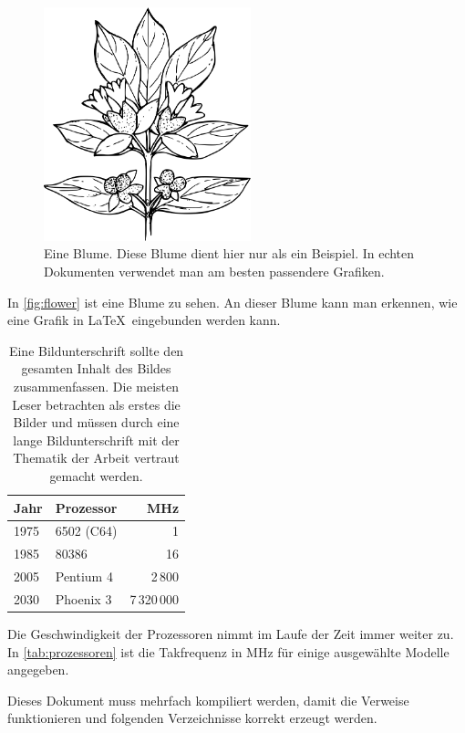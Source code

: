 \documentclass{scrartcl}
\begin{document}
  \begin{figure}
    \centering
    \includegraphics[width=6cm]{flower}
    \caption{Eine Blume. Diese Blume dient hier nur als ein
      Beispiel. In echten Dokumenten verwendet man am besten
      passendere Grafiken.}
    \label{fig:flower}
  \end{figure}

  In \autoref{fig:flower} ist eine Blume zu sehen. An dieser Blume
  kann man erkennen, wie eine Grafik in \LaTeX\ eingebunden werden
  kann.

  \begin{table}
    \centering
    \begin{tabular}{l|lr}
      \textbf{Jahr} & \textbf{Prozessor} &
          \textbf{MHz} \\
      \hline
      1975 & 6502 (C64) & 1 \\
      1985 & 80386 & 16 \\
      2005 & Pentium 4 & 2\,800 \\
      2030 & Phoenix 3 & 7\,320\,000
    \end{tabular}
    \caption{Eine Bildunterschrift sollte den gesamten Inhalt des
      Bildes zusammenfassen. Die meisten Leser betrachten als erstes
      die Bilder und müssen durch eine lange Bildunterschrift mit der
      Thematik der Arbeit vertraut gemacht werden.}
    \label{tab:prozessoren}
  \end{table}

  Die Geschwindigkeit der Prozessoren nimmt im Laufe der Zeit immer
  weiter zu. In \autoref{tab:prozessoren} ist die Takfrequenz in MHz
  für einige ausgewählte Modelle angegeben.

  Dieses Dokument muss mehrfach kompiliert werden, damit die Verweise
  funktionieren und folgenden Verzeichnisse korrekt erzeugt werden.

  \listoffigures
  \listoftables
\end{document}

